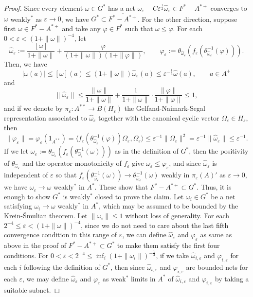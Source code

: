 \documentclass[a4paper]{amsart}
\newcommand{\e}{\varepsilon}
\theoremstyle{plain}
\theoremstyle{definition}
\begin{document}
\begin{proof}
Since every element $\omega\in G^*$ has a net $\omega_\e-C\e^{\frac12}\widehat\omega_\e\in F^*-A^{*+}$ converges to $\omega$ weakly$^*$ as $\e\to0$, we have $G^*\subset\overline{F^*-A^{*+}}$.
For the other direction, suppose first $\omega\in F^*-A^{*+}$ and take any $\varphi\in F^*$ such that $\omega\le\varphi$.
For each $0<\e<(1+\|\omega\|)^{-4}$, let
\[\widehat\omega_\e:=\frac{[\omega]}{1+\|\omega\|}+\frac\varphi{(1+\|\omega\|)(1+\|\varphi\|)},\qquad\varphi_\e:=\theta_{\widehat\omega_\e}(f_\e(\theta_{\widehat\omega_\e}^{-1}(\varphi))).\]
Then, we have
\[|\omega(a)|\le[\omega](a)\le(1+\|\omega\|)\widehat\omega_\e(a)\le\e^{-\frac14}\widehat\omega(a),\qquad a\in A^+\]
and
\[\|\widehat\omega_\e\|\le\frac{\|\omega\|}{1+\|\omega\|}+\frac1{1+\|\omega\|}\cdot\frac{\|\varphi\|}{1+\|\varphi\|}\le1,\]
and if we denote by $\pi_\e:A^{**}\to B(H_\e)$ the Gelfand-Naimark-Segal representation associated to $\widehat\omega_\e$ together with the canonical cyclic vector $\Omega_\e\in H_\e$, then
\[\|\varphi_\e\|=\varphi_\e(1_{A^{**}})=\langle f_\e(\theta_{\widehat\omega_\e}^{-1}(\varphi))\Omega_\e,\Omega_\e\rangle\le\e^{-1}\|\Omega_\e\|^2=\e^{-1}\|\widehat\omega_\e\|\le\e^{-1}.\]
If we let $\omega_\e:=\theta_{\widehat\omega_\e}(f_\e(\theta_{\widehat\omega_\e}^{-1}(\omega)))$ as in the definition of $G^*$, then the positivity of $\theta_{\widehat\omega_\e}$ and the operator monotonicity of $f_\e$ give $\omega_\e\le\varphi_\e$, and since $\widehat\omega_\e$ is independent of $\e$ so that $f_\e(\theta_{\widehat\omega_\e}^{-1}(\omega))\to\theta_{\widehat\omega_\e}^{-1}(\omega)$ weakly in $\pi_\e(A)'$ as $\e\to0$, we have $\omega_\e\to\omega$ weakly$^*$ in $A^*$.
These show that $F^*-A^{*+}\subset G^*$.
Thus, it is enough to show $G^*$ is weakly$^*$ closed to prove the claim.
Let $\omega_i\in G^*$ be a net satisfying $\omega_i\to\omega$ weakly$^*$ in $A^*$, which may be assumed to be bounded by the Krein-\v Smulian theorem.
Let $\|\omega_i\|\le1$ without loss of generality.
For each $2^{-4}\le\e<(1+\|\omega\|)^{-4}$, since we do not need to care about the last fifth convergence condition in this range of $\e$, we can define $\widehat\omega_\e$ and $\varphi_\e$ as same as above in the proof of $F^*-A^{*+}\subset G^*$ to make them satisfy the first four conditions.
For $0<\e<2^{-4}\le\inf_i(1+\|\omega_i\|)^{-\frac14}$, if we take $\widehat\omega_{i,\e}$ and $\varphi_{i,\e}$ for each $i$ following the definition of $G^*$, then since $\widehat\omega_{i,\e}$ and $\varphi_{i,\e}$ are bounded nets for each $\e$, we may define $\widehat\omega_\e$ and $\varphi_\e$ as weak$^*$ limits in $A^*$ of $\widehat\omega_{i,\e}$ and $\varphi_{i,\e}$ by taking a suitable subnet.

\end{proof}
\end{document}
